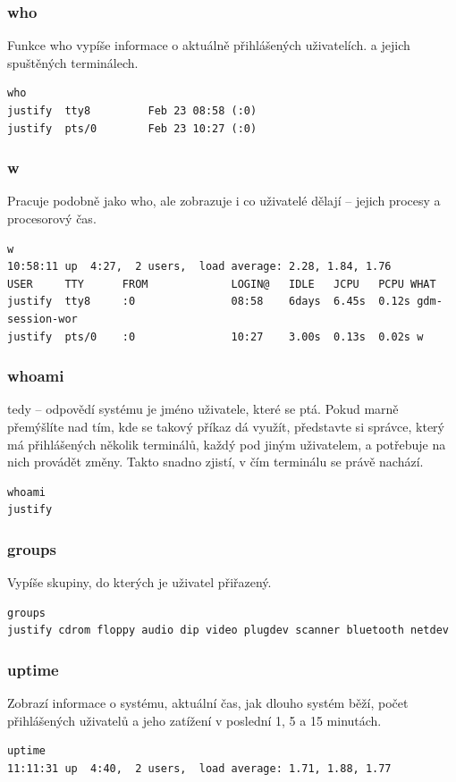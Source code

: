 \documentclass{article}
\begin{document}
\subsubsection{who}
Funkce who vypíše informace o aktuálně přihlášených uživatelích. a jejich spuštěných terminálech.
\begin{verbatim}
who
justify  tty8         Feb 23 08:58 (:0)
justify  pts/0        Feb 23 10:27 (:0)
\end{verbatim}

\subsubsection{w}
Pracuje podobně jako who, ale zobrazuje i co uživatelé dělají -- jejich procesy a procesorový čas.
\begin{verbatim}
w
10:58:11 up  4:27,  2 users,  load average: 2.28, 1.84, 1.76
USER     TTY      FROM             LOGIN@   IDLE   JCPU   PCPU WHAT
justify  tty8     :0               08:58    6days  6.45s  0.12s gdm-session-wor
justify  pts/0    :0               10:27    3.00s  0.13s  0.02s w
\end{verbatim}

\subsubsection{whoami}
 tedy  -- odpovědí systému je jméno uživatele, které se ptá. Pokud marně přemýšlíte nad tím, kde se takový příkaz dá využít, představte si správce, který má přihlášených několik terminálů, každý pod jiným uživatelem, a potřebuje na nich provádět změny. Takto snadno zjistí, v čím terminálu se právě nachází.
\begin{verbatim}
whoami
justify
\end{verbatim}

\subsubsection{groups}
Vypíše skupiny, do kterých je uživatel přiřazený.
\begin{verbatim}
groups 
justify cdrom floppy audio dip video plugdev scanner bluetooth netdev
\end{verbatim}

\subsubsection{uptime}
Zobrazí informace o systému, aktuální čas, jak dlouho systém běží, počet přihlášených uživatelů a jeho zatížení v poslední 1, 5 a 15 minutách.
\begin{verbatim}
uptime
11:11:31 up  4:40,  2 users,  load average: 1.71, 1.88, 1.77
\end{verbatim}
\end{document}
